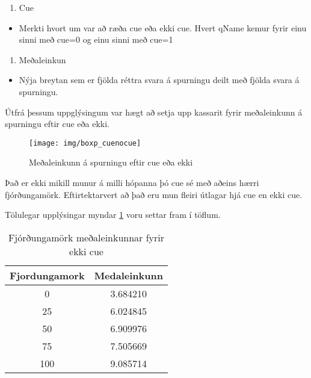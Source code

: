 \documentclass[
  10pt,
]{article}
\providecommand{\tightlist}{%
  \setlength{\itemsep}{0pt}\setlength{\parskip}{0pt}}
\begin{document}
\begin{enumerate}
\def\labelenumi{\arabic{enumi}.}
\setcounter{enumi}{1}
\tightlist
\item
  Cue
\end{enumerate}

\begin{itemize}
\tightlist
\item
  Merkti hvort um var að ræða cue eða ekki cue. Hvert qName kemur fyrir einu sinni með cue=0 og einu sinni með cue=1
\end{itemize}

\begin{enumerate}
\def\labelenumi{\arabic{enumi}.}
\setcounter{enumi}{2}
\tightlist
\item
  Meðaleinkun
\end{enumerate}

\begin{itemize}
\tightlist
\item
  Nýja breytan sem er fjölda réttra svara á spurningu deilt með fjölda svara á spurningu.
\end{itemize}

Útfrá þessum uppglýsingum var hægt að setja upp kassarit fyrir meðaleinkunn á spurningu eftir cue eða ekki.

\begin{figure}[H]

{\centering \texttt{[image: img/boxp\_cuenocue]} 

}

\caption{Meðaleinkunn á spurningu eftir cue eða ekki}\label{fig:mynd5}
\end{figure}

Það er ekki mikill munur á milli hópanna þó cue sé með aðeins hærri fjórðungamörk. Eftirtektarvert að það eru mun fleiri útlagar hjá cue en ekki cue.

\newpage

Tölulegar upplýsingar myndar \ref{fig:mynd5} voru settar fram í töflum.

\begin{table}[!h]

\caption{\label{tab:unnamed-chunk-5}\label{tab:strings} Fjórðungamörk meðaleinkunnar fyrir ekki cue}
\centering
\begin{tabular}[t]{cc}
\toprule
\textbf{Fjordungamork} & \textbf{Medaleinkunn}\\
\midrule
0 & 3.684210\\
25 & 6.024845\\
50 & 6.909976\\
75 & 7.505669\\
100 & 9.085714\\
\bottomrule
\end{tabular}
\end{table}
\end{document}
